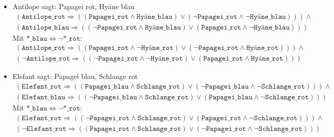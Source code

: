 \documentclass[a4paper,draft=false,oneside,12pt,ngerman]{scrreprt}
\begin{document}
\begin{itemize}
    \item Antilope sagt: Papagei rot, Hyäne blau
        \begin{align*}
            (\texttt{Antilope\_rot} \Rightarrow (
                (\texttt{Papagei\_rot} \land \texttt{Hyäne\_blau}) \lor
                (\neg \texttt{Papagei\_rot} \land \neg \texttt{Hyäne\_blau})
                )
            ) \land \\
            (\texttt{Antilope\_blau} \Rightarrow (
                (\neg \texttt{Papagei\_rot} \land \texttt{Hyäne\_blau}) \lor
                (\texttt{Papagei\_rot} \land \neg \texttt{Hyäne\_blau})
                )
            )
        \end{align*}
        Mit $ \texttt{*\_blau} \Leftrightarrow \neg \texttt{*\_rot} $:
        \begin{align*}
            (\texttt{Antilope\_rot} \Rightarrow (
                (\texttt{Papagei\_rot} \land \neg \texttt{Hyäne\_rot}) \lor
                (\neg \texttt{Papagei\_rot} \land \texttt{Hyäne\_rot})
                )
            ) \land \\
            (\neg \texttt{Antilope\_rot} \Rightarrow (
                (\neg \texttt{Papagei\_rot} \land \neg\texttt{Hyäne\_rot}) \lor
                (\texttt{Papagei\_rot} \land \texttt{Hyäne\_rot})
                )
            )
        \end{align*}
    \item Elefant sagt: Papagei blau, Schlange rot
        \begin{align*}
            (\texttt{Elefant\_rot} \Rightarrow (
                (\texttt{Papagei\_blau} \land \texttt{Schlange\_rot}) \lor
                (\neg \texttt{Papagei\_blau} \land \neg \texttt{Schlange\_rot})
                )
            ) \land \\
            (\texttt{Elefant\_blau} \Rightarrow (
                (\neg \texttt{Papagei\_blau} \land \texttt{Schlange\_rot}) \lor
                (\texttt{Papagei\_blau} \land \neg \texttt{Schlange\_rot})
                )
            )
        \end{align*}
        Mit $ \texttt{*\_blau} \Leftrightarrow \neg \texttt{*\_rot} $:
        \begin{align*}
            (\texttt{Elefant\_rot} \Rightarrow (
                (\neg \texttt{Papagei\_rot} \land \texttt{Schlange\_rot}) \lor
                (\texttt{Papagei\_rot} \land \neg \texttt{Schlange\_rot})
                )
            ) \land \\
            (\neg \texttt{Elefant\_rot} \Rightarrow (
                (\texttt{Papagei\_rot} \land \texttt{Schlange\_rot}) \lor
                (\neg \texttt{Papagei\_rot} \land \neg \texttt{Schlange\_rot})
                )
            )
        \end{align*}
\end{itemize}
\end{document}
